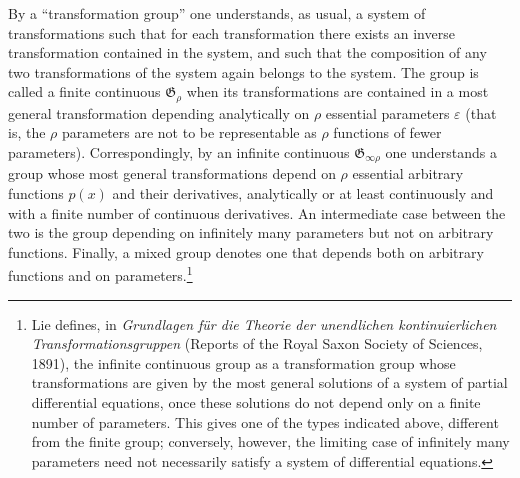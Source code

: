 \documentclass[11pt]{article}
\providecommand{\eps}{\varepsilon}
\providecommand{\G}{\mathfrak G}
\begin{document}
By a ``transformation group'' one understands, as usual, a system of transformations such that for each transformation there exists an inverse transformation contained in the system, and such that the composition of any two transformations of the system again belongs to the system. The group is called a finite continuous \(\G_\rho\) when its transformations are contained in a most general transformation depending analytically on \(\rho\) essential parameters \(\eps\) (that is, the \(\rho\) parameters are not to be representable as \(\rho\) functions of fewer parameters). Correspondingly, by an infinite continuous \(\G_{\infty\rho}\) one understands a group whose most general transformations depend on \(\rho\) essential arbitrary functions \(p(x)\) and their derivatives, analytically or at least continuously and with a finite number of continuous derivatives. An intermediate case between the two is the group depending on infinitely many parameters but not on arbitrary functions. Finally, a mixed group denotes one that depends both on arbitrary functions and on parameters.\footnote{Lie defines, in \emph{Grundlagen für die Theorie der unendlichen kontinuierlichen Transformationsgruppen} (Reports of the Royal Saxon Society of Sciences, 1891), the infinite continuous group as a transformation group whose transformations are given by the most general solutions of a system of partial differential equations, once these solutions do not depend only on a finite number of parameters. This gives one of the types indicated above, different from the finite group; conversely, however, the limiting case of infinitely many parameters need not necessarily satisfy a system of differential equations.}
\end{document}
